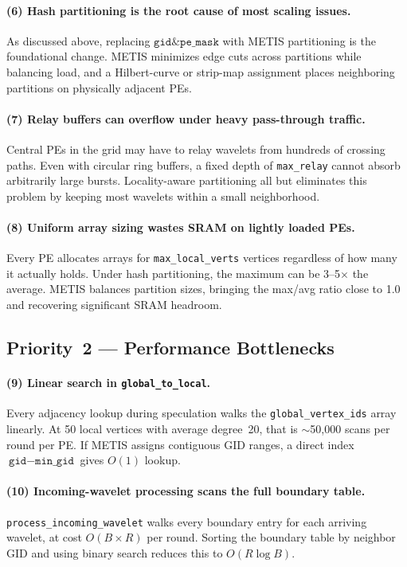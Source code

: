 \documentclass[11pt,letterpaper]{article}
\begin{document}
\paragraph{(6) Hash partitioning is the root cause of most scaling issues.}
As discussed above, replacing $\texttt{gid} \mathbin{\&} \texttt{pe\_mask}$
with METIS partitioning is the foundational change.
METIS minimizes edge cuts across partitions while balancing load,
and a Hilbert-curve or strip-map assignment places neighboring partitions
on physically adjacent PEs.

\paragraph{(7) Relay buffers can overflow under heavy pass-through traffic.}
Central PEs in the grid may have to relay wavelets from hundreds of crossing paths.
Even with circular ring buffers, a fixed depth of \texttt{max\_relay}
cannot absorb arbitrarily large bursts.
Locality-aware partitioning all but eliminates this problem
by keeping most wavelets within a small neighborhood.

\paragraph{(8) Uniform array sizing wastes SRAM on lightly loaded PEs.}
Every PE allocates arrays for \texttt{max\_local\_verts} vertices
regardless of how many it actually holds.
Under hash partitioning, the maximum can be 3--5$\times$ the average.
METIS balances partition sizes, bringing the max/avg ratio close to 1.0
and recovering significant SRAM headroom.

\subsection{Priority~2 --- Performance Bottlenecks}

\paragraph{(9) Linear search in \texttt{global\_to\_local}.}
Every adjacency lookup during speculation walks the \texttt{global\_vertex\_ids}
array linearly.
At 50 local vertices with average degree~20,
that is $\sim$50{,}000 scans per round per PE.
If METIS assigns contiguous GID ranges,
a direct index $\texttt{gid} - \texttt{min\_gid}$ gives $O(1)$ lookup.

\paragraph{(10) Incoming-wavelet processing scans the full boundary table.}
\texttt{process\_incoming\_wavelet} walks every boundary entry
for each arriving wavelet, at cost $O(B \times R)$ per round.
Sorting the boundary table by neighbor GID
and using binary search reduces this to $O(R \log B)$.
\end{document}
